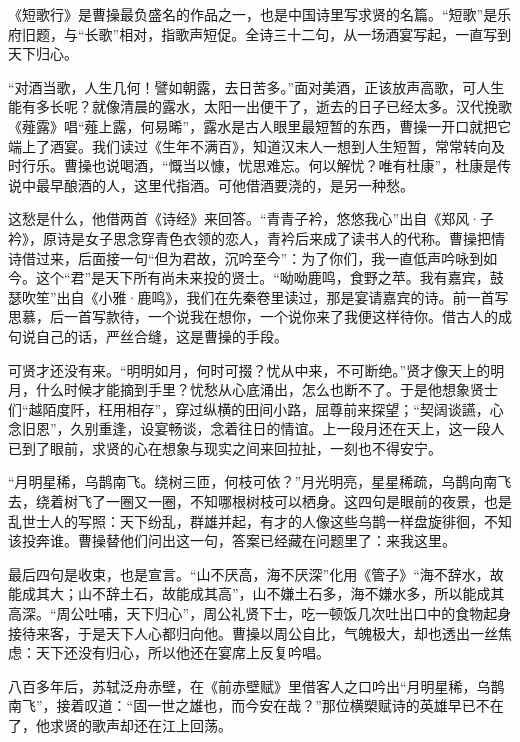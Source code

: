 \begin{appreciation}
《短歌行》是曹操最负盛名的作品之一，也是中国诗里写求贤的名篇。“短歌”是乐府旧题，与“长歌”相对，指歌声短促。全诗三十二句，从一场酒宴写起，一直写到天下归心。

“对酒当歌，人生几何！譬如朝露，去日苦多。”面对美酒，正该放声高歌，可人生能有多长呢？就像清晨的露水，太阳一出便干了，逝去的日子已经太多。汉代挽歌《薤露》唱“薤上露，何易晞”，露水是古人眼里最短暂的东西，曹操一开口就把它端上了酒宴。我们读过《生年不满百》，知道汉末人一想到人生短暂，常常转向及时行乐。曹操也说喝酒，“慨当以慷，忧思难忘。何以解忧？唯有杜康”，杜康是传说中最早酿酒的人，这里代指酒。可他借酒要浇的，是另一种愁。

这愁是什么，他借两首《诗经》来回答。“青青子衿，悠悠我心”出自《郑风·子衿》，原诗是女子思念穿青色衣领的恋人，青衿后来成了读书人的代称。曹操把情诗借过来，后面接一句“但为君故，沉吟至今”：为了你们，我一直低声吟咏到如今。这个“君”是天下所有尚未来投的贤士。“呦呦鹿鸣，食野之苹。我有嘉宾，鼓瑟吹笙”出自《小雅·鹿鸣》，我们在先秦卷里读过，那是宴请嘉宾的诗。前一首写思慕，后一首写款待，一个说我在想你，一个说你来了我便这样待你。借古人的成句说自己的话，严丝合缝，这是曹操的手段。

可贤才还没有来。“明明如月，何时可掇？忧从中来，不可断绝。”贤才像天上的明月，什么时候才能摘到手里？忧愁从心底涌出，怎么也断不了。于是他想象贤士们“越陌度阡，枉用相存”，穿过纵横的田间小路，屈尊前来探望；“契阔谈讌，心念旧恩”，久别重逢，设宴畅谈，念着往日的情谊。上一段月还在天上，这一段人已到了眼前，求贤的心在想象与现实之间来回拉扯，一刻也不得安宁。

“月明星稀，乌鹊南飞。绕树三匝，何枝可依？”月光明亮，星星稀疏，乌鹊向南飞去，绕着树飞了一圈又一圈，不知哪根树枝可以栖身。这四句是眼前的夜景，也是乱世士人的写照：天下纷乱，群雄并起，有才的人像这些乌鹊一样盘旋徘徊，不知该投奔谁。曹操替他们问出这一句，答案已经藏在问题里了：来我这里。

最后四句是收束，也是宣言。“山不厌高，海不厌深”化用《管子》“海不辞水，故能成其大；山不辞土石，故能成其高”，山不嫌土石多，海不嫌水多，所以能成其高深。“周公吐哺，天下归心”，周公礼贤下士，吃一顿饭几次吐出口中的食物起身接待来客，于是天下人心都归向他。曹操以周公自比，气魄极大，却也透出一丝焦虑：天下还没有归心，所以他还在宴席上反复吟唱。

八百多年后，苏轼泛舟赤壁，在《前赤壁赋》里借客人之口吟出“月明星稀，乌鹊南飞”，接着叹道：“固一世之雄也，而今安在哉？”那位横槊赋诗的英雄早已不在了，他求贤的歌声却还在江上回荡。
\end{appreciation}
